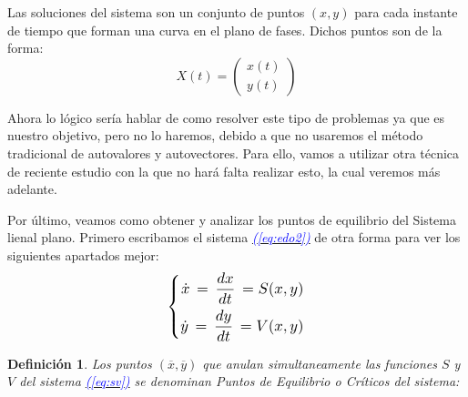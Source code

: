 \documentclass[12pt,a4paper]{report} %
\newtheorem{definicion}{Definición}[chapter] %
\newcommand{\eref}[1]{\hyperref[#1]{\textcolor{blue}{\textit{(\ref*{#1})}}}}
\begin{document}
	\noindent Las soluciones del sistema son un conjunto de puntos $(x,y)$ para cada instante de tiempo que forman una curva en el plano de fases. Dichos puntos son de la forma:
	\begin{equation}
		\label{eq:puntos}
		X(t)=\begin{pmatrix}
			x(t) \\ y(t)
		\end{pmatrix}
	\end{equation}\smallskip
	
	\noindent Ahora lo lógico sería hablar de como resolver este tipo de problemas ya que es nuestro objetivo, pero no lo haremos, debido a que no usaremos el método tradicional de autovalores y autovectores. Para ello, vamos a utilizar otra técnica de reciente estudio con la que no hará falta realizar esto, la cual veremos más adelante.
	
	\newpage
	
	Por último, veamos como obtener y analizar los puntos de equilibrio del Sistema lienal plano. Primero escribamos el sistema \eref{eq:edo2} de otra forma para ver los siguientes apartados mejor:
	\begin{equation}
		\label{eq:sv}
		\scalebox{1.2}{$\displaystyle
			\left\{
			\begin{aligned}
				\dot{x}\,=\,\frac{dx}{dt}\,=S(x,y) \\
				\dot{y}\,=\,\frac{dy}{dt}\,=V(x,y)
			\end{aligned}
			\right.
			$}
	\end{equation}\smallskip
	
	\begin{definicion}
		Los puntos $(\overline{x},\overline{y})$ que anulan simultaneamente las funciones $S$ y $V$ del sistema \eref{eq:sv} se denominan Puntos de Equilibrio o Críticos del sistema:
	\end{definicion}
\end{document}
